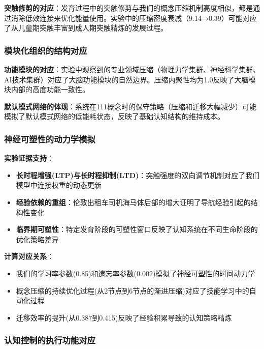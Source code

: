 \documentclass[12pt,a4paper]{article}
\begin{document}
\textbf{突触修剪的对应}：发育过程中的突触修剪与我们的概念压缩机制高度相似，都是通过消除低效连接来优化能量使用。实验中的压缩密度衰减（9.14→0.39）可能对应了从儿童期突触丰富到成人期突触精炼的发展过程。

\subsubsection{模块化组织的结构对应}

\textbf{功能模块的对应}：实验中观察到的专业领域压缩（物理力学集群、神经科学集群、AI技术集群）对应了大脑功能模块的自然边界。压缩内聚性均为1.0反映了大脑模块内部的高度功能一致性。

\textbf{默认模式网络的体现}：系统在111概念时的保守策略（压缩和迁移大幅减少）可能模拟了默认模式网络的低能耗状态，反映了基础认知结构的维持成本。

\subsubsection{神经可塑性的动力学模拟}

\textbf{实验证据支持}：
\begin{itemize}
\item \textbf{长时程增强(LTP)与长时程抑制(LTD)}：突触强度的双向调节机制对应了我们模型中连接权重的动态更新
\item \textbf{经验依赖的重组}：伦敦出租车司机海马体后部的增大证明了导航经验引起的结构性变化
\item \textbf{临界期可塑性}：特定发育阶段的可塑性窗口反映了认知系统在不同生命阶段的优化策略差异
\end{itemize}

\textbf{计算对应关系}：
\begin{itemize}
\item 我们的学习率参数(0.85)和遗忘率参数(0.002)模拟了神经可塑性的时间动力学
\item 概念压缩的持续优化过程(从2节点到6节点的渐进压缩)对应了技能学习中的自动化过程
\item 迁移效率的提升(从0.387到0.415)反映了经验积累导致的认知策略精炼
\end{itemize}

\subsubsection{认知控制的执行功能对应}
\end{document}
